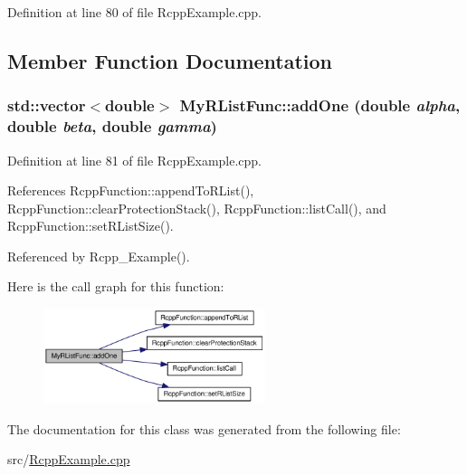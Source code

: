 Definition at line 80 of file RcppExample.cpp.

\subsection{Member Function Documentation}
\hypertarget{classMyRListFunc_0dec3b59e1e235c0502594a5d92cae13}{
\subsubsection[{addOne}]{\setlength{\rightskip}{0pt plus 5cm}std::vector$<$double$>$ MyRListFunc::addOne (double {\em alpha}, \/  double {\em beta}, \/  double {\em gamma})}}
\label{classMyRListFunc_0dec3b59e1e235c0502594a5d92cae13}




Definition at line 81 of file RcppExample.cpp.

References RcppFunction::appendToRList(), RcppFunction::clearProtectionStack(), RcppFunction::listCall(), and RcppFunction::setRListSize().

Referenced by Rcpp\_\-Example().

Here is the call graph for this function:\nopagebreak
\begin{figure}[H]
\begin{center}
\leavevmode
\includegraphics[width=184pt]{classMyRListFunc_0dec3b59e1e235c0502594a5d92cae13_cgraph}
\end{center}
\end{figure}


The documentation for this class was generated from the following file:\begin{CompactItemize}
\item 
src/\hyperlink{RcppExample_8cpp}{RcppExample.cpp}\end{CompactItemize}
